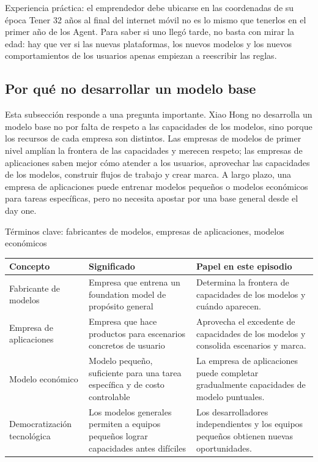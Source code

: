 \begin{importantbox}{Experiencia práctica: el emprendedor debe ubicarse en las coordenadas de su época}
Tener 32 años al final del internet móvil no es lo mismo que tenerlos en el primer año de los Agent. Para saber si uno llegó tarde, no basta con mirar la edad: hay que ver si las nuevas plataformas, los nuevos modelos y los nuevos comportamientos de los usuarios apenas empiezan a reescribir las reglas.
\end{importantbox}

\subsection{Por qué no desarrollar un modelo base}

Esta subsección responde a una pregunta importante. Xiao Hong no desarrolla un modelo base no por falta de respeto a las capacidades de los modelos, sino porque los recursos de cada empresa son distintos. Las empresas de modelos de primer nivel amplían la frontera de las capacidades y merecen respeto; las empresas de aplicaciones saben mejor cómo atender a los usuarios, aprovechar las capacidades de los modelos, construir flujos de trabajo y crear marca. A largo plazo, una empresa de aplicaciones puede entrenar modelos pequeños o modelos económicos para tareas específicas, pero no necesita apostar por una base general desde el day one.

\begin{knowledgebox}{Términos clave: fabricantes de modelos, empresas de aplicaciones, modelos económicos}
\noindent\begin{tabularx}{\textwidth}{p{}p{}X}
\toprule
Concepto & Significado & Papel en este episodio \\
\midrule
Fabricante de modelos & Empresa que entrena un foundation model de propósito general & Determina la frontera de capacidades de los modelos y cuándo aparecen. \\
Empresa de aplicaciones & Empresa que hace productos para escenarios concretos de usuario & Aprovecha el excedente de capacidades de los modelos y consolida escenarios y marca. \\
Modelo económico & Modelo pequeño, suficiente para una tarea específica y de costo controlable & La empresa de aplicaciones puede completar gradualmente capacidades de modelo puntuales. \\
Democratización tecnológica & Los modelos generales permiten a equipos pequeños lograr capacidades antes difíciles & Los desarrolladores independientes y los equipos pequeños obtienen nuevas oportunidades. \\
\bottomrule
\end{tabularx}
\end{knowledgebox}

